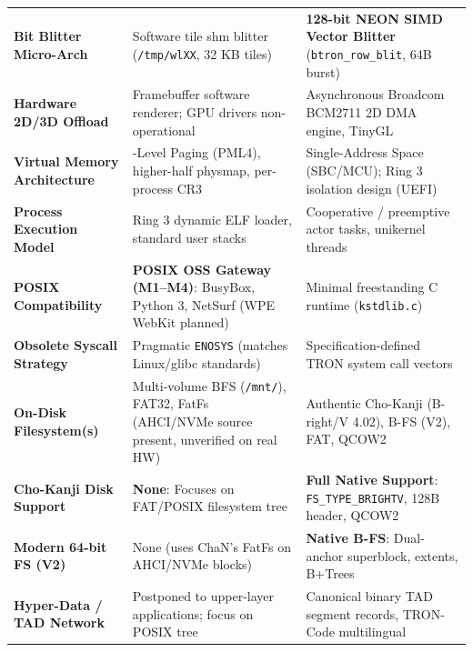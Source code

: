 \documentclass[10pt,journal,compsoc,twocolumn]{article}
\begin{document}
\begin{table}[t]
\begin{tabularx}{\textwidth}{@{} >{\raggedright\arraybackslash\bfseries}p{3.4cm} >{\raggedright\arraybackslash}X >{\raggedright\arraybackslash}X @{}}
Bit Blitter Micro-Arch & Software tile shm blitter (\texttt{/tmp/wlXX}, 32 KB tiles) & \textbf{128-bit NEON SIMD Vector Blitter} (\texttt{btron\_row\_blit}, 64B burst) \\
Hardware 2D/3D Offload & Framebuffer software renderer; GPU drivers non-operational & Asynchronous Broadcom BCM2711 2D DMA engine, TinyGL \\
\midrule
Virtual Memory Architecture & 4-Level Paging (PML4), higher-half physmap, per-process CR3 & Single-Address Space (SBC/MCU); Ring 3 isolation design (UEFI) \\
Process Execution Model & Ring 3 dynamic ELF loader, standard user stacks & Cooperative / preemptive actor tasks, unikernel threads \\
POSIX Compatibility & \textbf{POSIX OSS Gateway (M1--M4)}: BusyBox, Python 3, NetSurf (WPE WebKit planned) & Minimal freestanding C runtime (\texttt{kstdlib.c}) \\
Obsolete Syscall Strategy & Pragmatic \texttt{ENOSYS} (matches Linux/glibc standards) & Specification-defined TRON system call vectors \\
\midrule
On-Disk Filesystem(s) & Multi-volume BFS (\texttt{/mnt/}), FAT32, FatFs (AHCI/NVMe source present, unverified on real HW) & Authentic Cho-Kanji (B-right/V 4.02), B-FS (V2), FAT, QCOW2 \\
Cho-Kanji Disk Support & \textbf{None}: Focuses on FAT/POSIX filesystem tree & \textbf{Full Native Support}: \texttt{FS\_TYPE\_BRIGHTV}, 128B header, QCOW2 \\
Modern 64-bit FS (V2) & None (uses ChaN's FatFs on AHCI/NVMe blocks) & \textbf{Native B-FS}: Dual-anchor superblock, extents, B+Trees \\
Hyper-Data / TAD Network & Postponed to upper-layer applications; focus on POSIX tree & Canonical binary TAD segment records, TRON-Code multilingual \\
\bottomrule
\end{tabularx}
\end{table}
\end{document}
